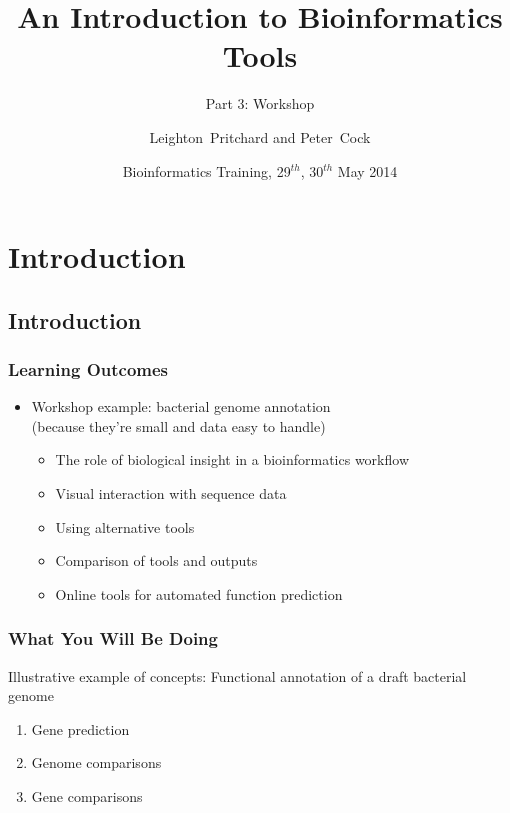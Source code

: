 
%



\title[Intro to Bioinformatics] %
{An Introduction to Bioinformatics Tools}
\subtitle{Part 3: Workshop}
\author[Pritchard, Cock] %
{Leighton~Pritchard and Peter~Cock}
\date[May 2014] %
{Bioinformatics Training, 29$^{th}$, 30$^{th}$ May 2014}
\subject{Bioinformatics}





\frame[plain]{\titlepage}
 
\section{Introduction}
\subsection{Introduction}
\begin{frame}
  \frametitle{Learning Outcomes}
  \begin{itemize}
    \item Workshop example: bacterial genome annotation \\
             (because they're small and data easy to handle)
    \begin{itemize}
      \item The role of biological insight in a bioinformatics workflow
      \item Visual interaction with sequence data
      \item Using alternative tools
      \item Comparison of tools and outputs
      \item Online tools for automated function prediction
    \end{itemize}
  \end{itemize}
\end{frame} 
  
\begin{frame}
  \frametitle{What You Will Be Doing}
  Illustrative example of concepts: Functional annotation of a draft bacterial genome
  \begin{enumerate}
    \item Gene prediction
    \item Genome comparisons
    \item Gene comparisons
  \end{enumerate}
\end{frame}

